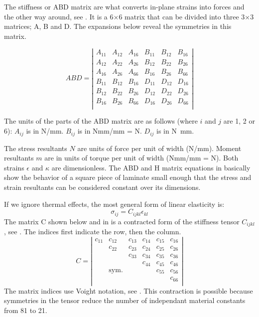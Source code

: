 \documentclass[a4paper,landscape,oneside,11pt,twocolumn]{memoir}
\begin{document}
The stiffness or ABD matrix are what converts
in-plane strains into forces and the other way around, see
.  It is a 6×6 matrix that can be divided
into three 3×3 matrices; A, B and D.
The expansions below reveal the symmetries in this matrix.

\[
    ABD = \left|\begin{array}{cccccc}
        A_{11} & A_{12} & A_{16} & B_{11} & B_{12} & B_{16}\\
        A_{12} & A_{22} & A_{26} & B_{12} & B_{22} & B_{26}\\
        A_{16} & A_{26} & A_{66} & B_{16} & B_{26} & B_{66}\\
        B_{11} & B_{12} & B_{16} & D_{11} & D_{12} & D_{16}\\
        B_{12} & B_{22} & B_{26} & D_{12} & D_{22} & D_{26}\\
        B_{16} & B_{26} & B_{66} & D_{16} & D_{26} & D_{66}\\
    \end{array}\right|
\]

The units of the parts of the ABD matrix are as follows (where $i$ and
$j$ are 1, 2 or 6): $A_{ij}$ is in \si{N/mm}. $B_{ij}$ is in \si{Nmm/mm}
= \si{N}.  $D_{ij}$ is in \si{N.mm}.

The stress resultants $N$ are units of force per unit of width (\si{N/mm}).
Moment resultants $m$ are in units of torque per unit of width (\si{Nmm/mm}
= \si{N}). Both strains $\epsilon$ and $\kappa$ are dimensionless.
The ABD and H matrix equations in  basically show the
behavior of a square piece of laminate small enough that the stress and strain
resultants can be considered constant over its dimensions.

If we ignore thermal effects, the most general form of linear elasticity is:
\[
    \sigma_{ij} = C_{ijkl}\epsilon_{kl}
\]
The matrix C shown below and in  is a contracted form of
the stiffness tensor $C_{ijkl}$, see \citet[p. 78]{Bower:2010}.
The indices first indicate the row, then the column.
\[
    C = \left|\begin{array}{cccccc}
        c_{11} & c_{12} & c_{13} & c_{14} & c_{15} & c_{16}\\
               & c_{22} & c_{23} & c_{24} & c_{25} & c_{26}\\
               &        & c_{33} & c_{34} & c_{35} & c_{36}\\
               &        &        & c_{44} & c_{45} & c_{46}\\
               &  \mathrm{sym.}  &        &        & c_{55} & c_{56}\\
               &        &        &        &        & c_{66}\\
    \end{array}\right|
\]
The matrix indices use Voight notation, see \citet[p. 310]{Barbero:2008}.
This contraction is possible because symmetries in the tensor reduce the
number of independant material constants from 81 to 21.
\end{document}

